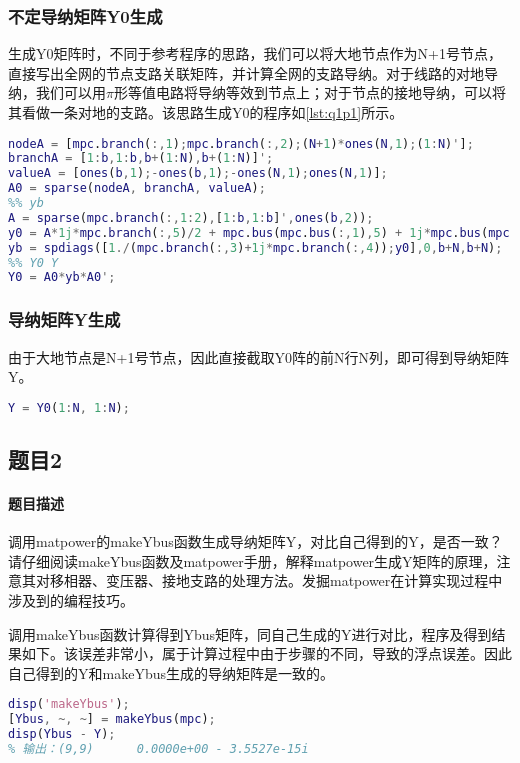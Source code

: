 \documentclass[a4paper,12pt]{article}
\begin{document}
    \subsubsection{不定导纳矩阵Y0生成}
    生成Y0矩阵时，不同于参考程序的思路，我们可以将大地节点作为N+1号节点，直接写出全网的节点支路关联矩阵，并计算全网的支路导纳。对于线路的对地导纳，我们可以用$\pi$形等值电路将导纳等效到节点上；对于节点的接地导纳，可以将其看做一条对地的支路。该思路生成Y0的程序如\cref{lst:q1p1}所示。
    \begin{lstlisting}[language=matlab,label=lst:q1p1,caption={不定节点导纳矩阵Y0生成程序}]
%% A0
nodeA = [mpc.branch(:,1);mpc.branch(:,2);(N+1)*ones(N,1);(1:N)'];
branchA = [1:b,1:b,b+(1:N),b+(1:N)]';
valueA = [ones(b,1);-ones(b,1);-ones(N,1);ones(N,1)];
A0 = sparse(nodeA, branchA, valueA);
%% yb
A = sparse(mpc.branch(:,1:2),[1:b,1:b]',ones(b,2));
y0 = A*1j*mpc.branch(:,5)/2 + mpc.bus(mpc.bus(:,1),5) + 1j*mpc.bus(mpc.bus(:,1),6);
yb = spdiags([1./(mpc.branch(:,3)+1j*mpc.branch(:,4));y0],0,b+N,b+N);
%% Y0 Y
Y0 = A0*yb*A0';
    \end{lstlisting}
    \subsubsection{导纳矩阵Y生成}
    由于大地节点是N+1号节点，因此直接截取Y0阵的前N行N列，即可得到导纳矩阵Y。
    \begin{lstlisting}[language=matlab]
Y = Y0(1:N, 1:N);
    \end{lstlisting}
    \subsection{题目2}
    \paragraph{题目描述} 调用matpower的makeYbus函数生成导纳矩阵Y，对比自己得到的Y，是否一致？请仔细阅读makeYbus函数及matpower手册，解释matpower生成Y矩阵的原理，注意其对移相器、变压器、接地支路的处理方法。发掘matpower在计算实现过程中涉及到的编程技巧。

    调用makeYbus函数计算得到Ybus矩阵，同自己生成的Y进行对比，程序及得到结果如下。该误差非常小，属于计算过程中由于步骤的不同，导致的浮点误差。因此自己得到的Y和makeYbus生成的导纳矩阵是一致的。
    \begin{lstlisting}[language=matlab]
%% makeYbus
disp('makeYbus');
[Ybus, ~, ~] = makeYbus(mpc);
disp(Ybus - Y);
% 输出：(9,9)      0.0000e+00 - 3.5527e-15i
    \end{lstlisting}
\end{document}
